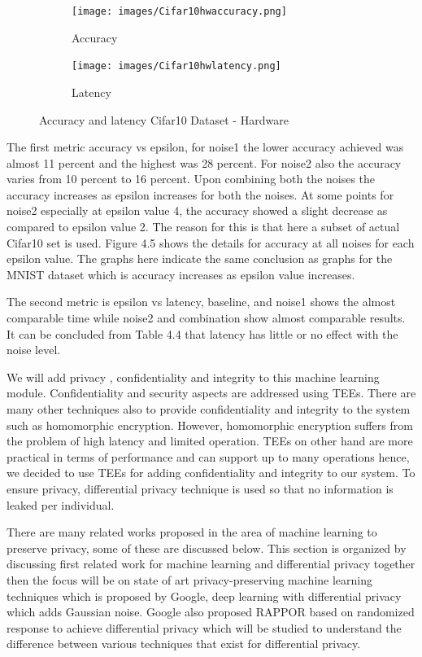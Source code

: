 \begin{figure}
     \begin{subfigure}{0.5\textwidth}
         \texttt{[image: images/Cifar10hwaccuracy.png]}
         \caption{Accuracy}
         \label{default}
     \end{subfigure}
     \begin{subfigure}{0.5\textwidth}
         \texttt{[image: images/Cifar10hwlatency.png]}
         \caption{Latency}
         \label{default}
     \end{subfigure}
        \caption{Accuracy and latency Cifar10 Dataset - Hardware}
        \label{default}
\end{figure}

The first metric accuracy vs epsilon, for noise1 the lower accuracy achieved was almost 11 percent and the highest was 28 percent. For noise2 also the accuracy varies from 10 percent to 16 percent. Upon combining both the noises the accuracy increases as epsilon increases for both the noises. At some points for noise2 especially at epsilon value 4, the accuracy showed a slight decrease as compared to epsilon value 2. The reason for this is that here a subset of actual Cifar10 set is used. Figure 4.5 shows the details for accuracy at all noises for each epsilon value. The graphs here indicate the same conclusion as graphs for the MNIST dataset which is accuracy increases as epsilon value increases.

The second metric is epsilon vs latency, baseline, and noise1 shows the almost comparable time while noise2 and combination show almost comparable results. It can be concluded from Table 4.4 that latency has little or no effect with the noise level.

We will add privacy , confidentiality and integrity to this machine learning module. Confidentiality and security aspects are addressed using TEEs. There are many other techniques also to provide confidentiality and integrity to the system such as homomorphic encryption. However, homomorphic encryption suffers from the problem of high latency and limited operation. TEEs on other hand are more practical in terms of performance and can support up to many operations hence, we decided to use TEEs for adding confidentiality and integrity to our system. To ensure privacy, differential privacy technique \cite{3} is used so that no information is leaked per individual. 

There are many related works proposed in the area of machine learning to preserve privacy, some of these are discussed below. This section is organized by discussing first related work for machine learning and differential privacy together then the focus will be on state of art privacy-preserving machine learning techniques which is proposed by Google, deep learning with differential privacy which adds Gaussian noise. Google also proposed RAPPOR based on randomized response to achieve differential privacy which will be studied to understand the difference between various techniques that exist for differential privacy.

